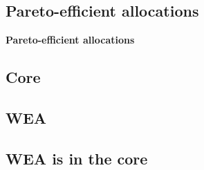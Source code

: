 \documentclass{article}
\begin{document}
\subsection{Pareto-efficient allocations}

\begin{mdframed}[backgroundcolor=blue!20,linecolor=white]
\textbf{Pareto-efficient allocations}



\end{mdframed}



\subsection{Core}




\subsection{WEA}




\subsection{WEA is in the core}
\end{document}
